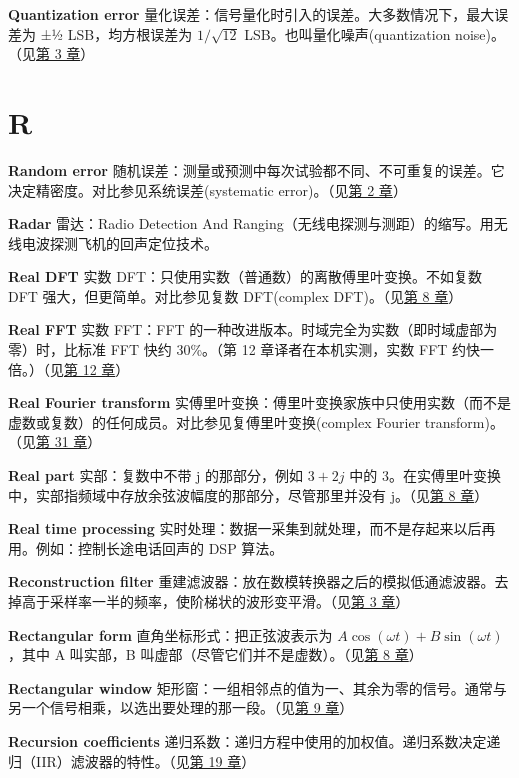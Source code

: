 \textbf{Quantization error}
量化误差：信号量化时引入的误差。大多数情况下，最大误差为 ±½
LSB，均方根误差为 \(1/\sqrt{12}\) LSB。也叫量化噪声(quantization
noise)。（见\hyperref[ch-03]{第 3 章}）

\section{R}

\textbf{Random error}
随机误差：测量或预测中每次试验都不同、不可重复的误差。它决定精密度。对比参见系统误差(systematic
error)。（见\hyperref[ch-02]{第 2 章}）

\textbf{Radar} 雷达：Radio Detection And
Ranging（无线电探测与测距）的缩写。用无线电波探测飞机的回声定位技术。

\textbf{Real DFT} 实数
DFT：只使用实数（普通数）的离散傅里叶变换。不如复数 DFT
强大，但更简单。对比参见复数 DFT(complex DFT)。（见\hyperref[ch-08]{第 8
章}）

\textbf{Real FFT} 实数 FFT：FFT
的一种改进版本。时域完全为实数（即时域虚部为零）时，比标准 FFT 快约
30\%。（第 12 章译者在本机实测，实数 FFT
约快一倍。）（见\hyperref[ch-12]{第 12 章}）

\textbf{Real Fourier transform}
实傅里叶变换：傅里叶变换家族中只使用实数（而不是虚数或复数）的任何成员。对比参见复傅里叶变换(complex
Fourier transform)。（见\hyperref[ch-31]{第 31 章}）

\textbf{Real part} 实部：复数中不带 j 的那部分，例如 \(3+2j\) 中的
3。在实傅里叶变换中，实部指频域中存放余弦波幅度的那部分，尽管那里并没有
j。（见\hyperref[ch-08]{第 8 章}）

\textbf{Real time processing}
实时处理：数据一采集到就处理，而不是存起来以后再用。例如：控制长途电话回声的
DSP 算法。

\textbf{Reconstruction filter}
重建滤波器：放在数模转换器之后的模拟低通滤波器。去掉高于采样率一半的频率，使阶梯状的波形变平滑。（见\hyperref[ch-03]{第
3 章}）

\textbf{Rectangular form} 直角坐标形式：把正弦波表示为
\(A\cos(\omega t) + B\sin(\omega t)\)，其中 A 叫实部，B
叫虚部（尽管它们并不是虚数）。（见\hyperref[ch-08]{第 8 章}）

\textbf{Rectangular window}
矩形窗：一组相邻点的值为一、其余为零的信号。通常与另一个信号相乘，以选出要处理的那一段。（见\hyperref[ch-09]{第
9 章}）

\textbf{Recursion coefficients}
递归系数：递归方程中使用的加权值。递归系数决定递归（IIR）滤波器的特性。（见\hyperref[ch-19]{第
19 章}）

